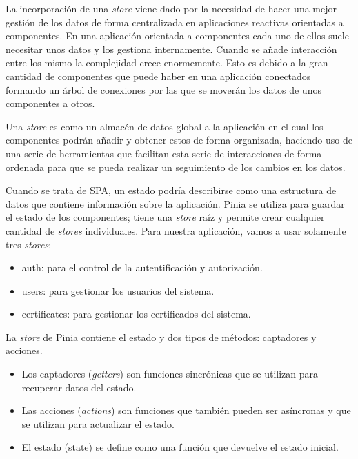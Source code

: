 La incorporación de una \textit{store} viene dado por la necesidad de hacer una mejor gestión de los datos de forma centralizada en aplicaciones reactivas orientadas a componentes. En una aplicación orientada a componentes cada uno de ellos suele necesitar unos datos y los gestiona internamente. Cuando se añade interacción entre los mismo la complejidad crece enormemente. Esto es debido a la gran cantidad de componentes que puede haber en una aplicación conectados formando un árbol de conexiones por las que se moverán los datos de unos componentes a otros.

Una \textit{store} es como un almacén de datos global a la aplicación en el cual los componentes podrán añadir y obtener estos de forma organizada, haciendo uso de una serie de herramientas que facilitan esta serie de interacciones de forma ordenada para que se pueda realizar un seguimiento de los cambios en los datos.

Cuando se trata de SPA, un estado podría describirse como una estructura de datos que contiene información sobre la aplicación. Pinia se utiliza para guardar el estado de los componentes; tiene una \textit{store} raíz y permite crear cualquier cantidad de \textit{stores} individuales. Para nuestra aplicación, vamos a usar solamente tres \textit{stores}:

\begin{itemize}
\item auth: para el control de la autentificación y autorización.
\item users: para gestionar los usuarios del sistema.
\item certificates: para gestionar los certificados del sistema.
\end{itemize}

La \textit{store} de Pinia contiene el estado y dos tipos de métodos: captadores y acciones.
\begin{itemize}
\item Los captadores (\textit{getters}) son funciones sincrónicas que se utilizan para recuperar datos del estado.
\item Las acciones (\textit{actions}) son funciones que también pueden ser asíncronas y que se utilizan para actualizar el estado.
\item El estado (state) se define como una función que devuelve el estado inicial.
\end{itemize}


